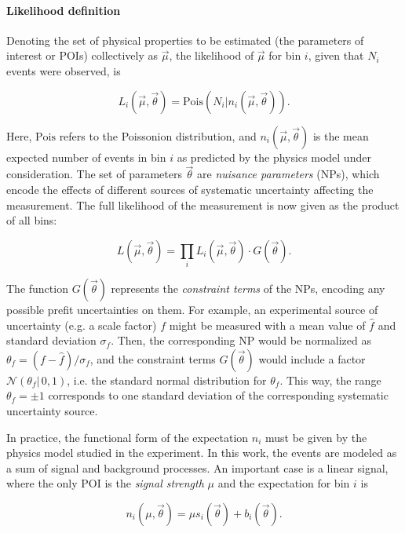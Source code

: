 \paragraph{Likelihood definition}
Denoting the set of physical properties to be estimated (the parameters of interest or POIs) collectively as $\vec{\mu}$, the likelihood of $\vec{\mu}$ for bin $i$, given that $N_i$ events were observed, is~\cite{Cowan:2010js}

\begin{equation}
    L_i (\vec{\mu}, \vec{\theta}) = \mathrm{Pois} \left(N_i | n_i (\vec{\mu}, \vec{\theta}) \right).
\end{equation}

Here, $\mathrm{Pois}$ refers to the Poissonion distribution, and $n_i (\vec{\mu}, \vec{\theta})$ is the mean expected number of events in bin $i$ as predicted by the physics model under consideration. The set of parameters $\vec{\theta}$ are \textit{nuisance parameters} (NPs), which encode the effects of different sources of systematic uncertainty affecting the measurement. The full likelihood of the measurement is now given as the product of all bins:

\begin{equation}
    L (\vec{\mu}, \vec{\theta}) = \prod_i L_i (\vec{\mu}, \vec{\theta}) \cdot G(\vec{\theta}).
\end{equation}

The function $G(\vec{\theta})$ represents the \textit{constraint terms} of the NPs, encoding any possible prefit uncertainties on them. For example, an experimental source of uncertainty (e.g. a scale factor) $f$ might be measured with a mean value of $\hat{f}$ and standard deviation $\sigma_f$. Then, the corresponding NP would be normalized as $\theta_f = (f-\hat{f})/\sigma_f$, and the constraint terms $G(\vec{\theta})$ would include a factor $\mathcal{N}(\theta_f | \, 0,1)$, i.e. the standard normal distribution for $\theta_f$. This way, the range $\theta_f = \pm 1$ corresponds to one standard deviation of the corresponding systematic uncertainty source.

In practice, the functional form of the expectation $n_i$ must be given by the physics model studied in the experiment. In this work, the events are modeled as a sum of signal and background processes. An important case is a linear signal, where the only POI is the \textit{signal strength} $\mu$ and the expectation for bin $i$ is

\begin{equation}
\label{eq:methods:linearsignal}
    n_i (\mu, \vec{\theta}) = \mu s_i (\vec{\theta}) + b_i (\vec{\theta}).
\end{equation}

